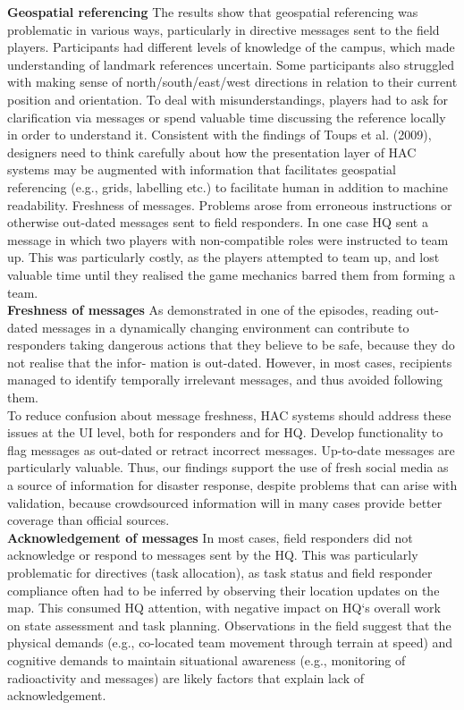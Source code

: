 \textbf{Geospatial referencing} The results show that geospatial referencing was problematic in various ways, particularly in directive messages sent to the field players. Participants had different levels of knowledge of the campus, which made understanding of landmark references uncertain. Some participants also struggled with making sense of north/south/east/west directions in relation to their current position and orientation. To deal with misunderstandings, players had to ask for clarification via messages or spend valuable time discussing the reference locally in order to understand it. Consistent with the findings of Toups et al. (2009), designers need to think carefully about how the presentation layer of HAC systems may be augmented with information that facilitates geospatial referencing (e.g., grids, labelling etc.) to facilitate human in addition to machine readability. Freshness of messages. Problems arose from erroneous instructions or otherwise out-dated messages sent to field responders. In one case HQ sent a message in which two players with non-compatible roles were instructed to team up. This was particularly costly, as the players attempted to team up, and lost valuable time until they realised the game mechanics barred them from forming a team.\\

\textbf{Freshness of messages} As demonstrated in one of the episodes, reading out-dated messages in a dynamically changing environment can contribute to responders taking dangerous actions that they believe to be safe, because they do not realise that the infor- mation is out-dated. However, in most cases, recipients managed to identify temporally irrelevant messages, and thus avoided following them.\\

To reduce confusion about message freshness, HAC systems should address these issues at the UI level, both for responders and for HQ. Develop functionality to flag messages as out-dated or retract incorrect messages. Up-to-date messages are particularly valuable. Thus, our findings support the use of fresh social media as a source of information for disaster response, despite problems that can arise with validation, because crowdsourced information will in many cases provide better coverage than official sources.\\

\textbf{Acknowledgement of messages} In most cases, field responders did not acknowledge or respond to messages sent by the HQ. This was particularly problematic for directives (task allocation), as task status and field responder compliance often had to be inferred by observing their location updates on the map. This consumed HQ attention, with negative impact on HQ`s overall work on state assessment and task planning. Observations in the field suggest that the physical demands (e.g., co-located team movement through terrain at speed) and cognitive demands to maintain situational awareness (e.g., monitoring of radioactivity and messages) are likely factors that explain lack of acknowledgement.\\

